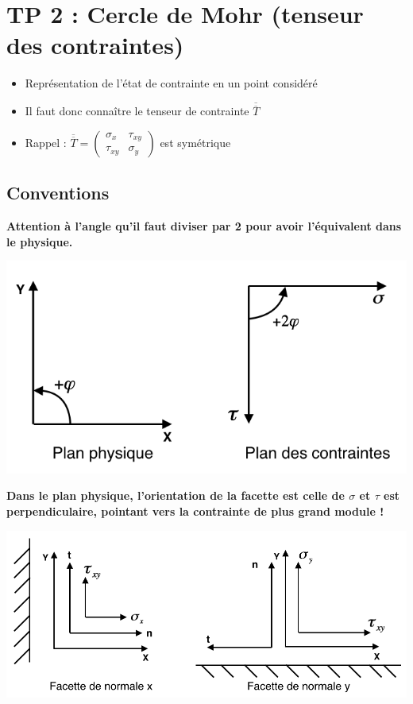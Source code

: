 
\section*{TP 2 : Cercle de Mohr (tenseur des contraintes)}
\begin{itemize}
	\item Représentation de l'état de contrainte en un point considéré
	\item Il faut donc connaître le tenseur de contrainte $\overline{\overline{T}}$
	\item Rappel : $\overline{\overline{T}} = 
	      \left(	
	      \begin{array}{cc}
	      	\sigma _x  & \tau _{xy} \\ 
	      	\tau _{xy} & \sigma _y  
	      \end{array}
	      \right) $ est symétrique
\end{itemize}

\subsection*{Conventions}
\noindent \textbf{Attention à l'angle qu'il faut diviser par 2 pour avoir l'équivalent dans le physique.}
\begin{center}
	\includegraphics[scale=0.6]{tp2-1}
\end{center}

\textbf{Dans le plan physique, l'orientation de la facette est celle de $\sigma$ et $\tau$ est perpendiculaire, pointant vers la contrainte de plus grand module !}
\begin{center}
	\includegraphics[scale=0.6]{tp2-2}
\end{center}

